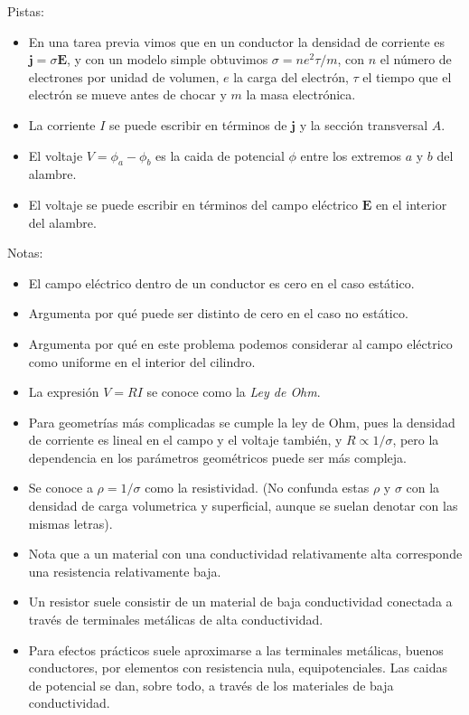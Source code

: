 \documentclass{exam}
\begin{document}
\begin{questions}
  Pistas:
  \begin{itemize}
  \item En una tarea previa vimos que en un conductor la densidad de
    corriente es $\bm j=\sigma\bm E$, y con un modelo simple obtuvimos
    $\sigma=ne^2\tau/m$, con $n$ el número de electrones por unidad de
    volumen, $e$ la carga del electrón, $\tau$ el tiempo que el
    electrón se mueve antes de chocar y $m$ la masa electrónica.
  \item La corriente $I$ se puede escribir en términos de $\bm j$ y la
    sección transversal $A$.
  \item El voltaje $V=\phi_a-\phi_b$ es la caida de potencial $\phi$
    entre los extremos $a$ y $b$ del alambre.
  \item El voltaje se puede escribir en términos del campo eléctrico
    $\bm E$ en el interior del alambre.
  \end{itemize}
  Notas:
  \begin{itemize}
  \item El campo eléctrico dentro de un conductor es cero en el caso
    estático.
  \item Argumenta por qué puede ser distinto de cero en el caso no
    estático.
  \item Argumenta por qué en este problema podemos considerar al campo
    eléctrico como uniforme en el interior del cilindro.
  \item La expresión $V=RI$ se conoce como la {\em Ley de Ohm}.
  \item Para geometrías más complicadas se cumple la ley de Ohm, pues
    la densidad de corriente es lineal en el campo y el voltaje
    también, y $R\propto 1/\sigma$, pero la dependencia en los parámetros
    geométricos puede ser más compleja.
  \item Se conoce a $\rho=1/\sigma$ como la resistividad. (No confunda
    estas $\rho$ y $\sigma$ con la densidad de carga volumetrica y
    superficial, aunque se suelan denotar con las mismas letras).
  \item Nota que a un material con una conductividad relativamente alta
    corresponde  una resistencia relativamente baja.
  \item Un resistor suele consistir de un material de baja
    conductividad conectada a través de terminales metálicas de alta
    conductividad.
  \item Para efectos prácticos suele aproximarse a
    las terminales metálicas, buenos conductores, por elementos con
    resistencia nula, equipotenciales. Las caidas de potencial se dan,
    sobre todo, a través de los materiales de baja conductividad.
  \end{itemize}


\end{questions}
\end{document}
